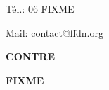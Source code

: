 \begin{titlepage}
\begin{marges}{-0.6in}{-0.6in}
\begin{enumerate}
Tél.: 06 FIXME

Mail: \url{contact@ffdn.org}
\end{enumerate}

\vskip 1cm

       
\noindent\textbf{CONTRE}

\vskip 1cm

\textbf{FIXME}

\end{marges}

\end{titlepage}

